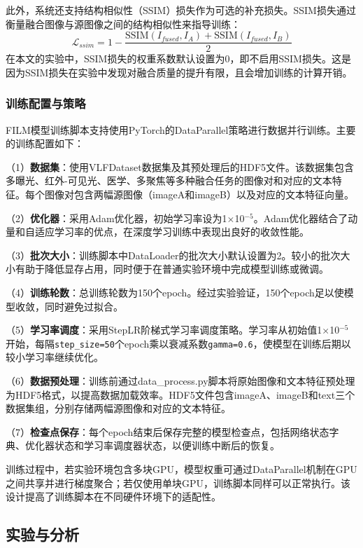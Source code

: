 此外，系统还支持结构相似性（SSIM）损失作为可选的补充损失。SSIM损失通过衡量融合图像与源图像之间的结构相似性来指导训练：
\begin{equation}
    \mathcal{L}_{ssim} = 1 - \frac{\text{SSIM}(I_{fused}, I_A) + \text{SSIM}(I_{fused}, I_B)}{2}
\end{equation}
在本文的实验中，SSIM损失的权重系数默认设置为0，即不启用SSIM损失。这是因为SSIM损失在实验中发现对融合质量的提升有限，且会增加训练的计算开销。

\subsubsection{训练配置与策略}\label{sec:training_config}

FILM模型训练脚本支持使用PyTorch的DataParallel策略进行数据并行训练。主要的训练配置如下：

（1）\textbf{数据集}：使用VLFDataset数据集及其预处理后的HDF5文件。该数据集包含多曝光、红外-可见光、医学、多聚焦等多种融合任务的图像对和对应的文本特征。每个图像对包含两幅源图像（imageA和imageB）以及对应的文本特征向量。

（2）\textbf{优化器}：采用Adam优化器，初始学习率设为1$\times$10$^{-5}$。Adam优化器结合了动量和自适应学习率的优点，在深度学习训练中表现出良好的收敛性能。

（3）\textbf{批次大小}：训练脚本中DataLoader的批次大小默认设置为2。较小的批次大小有助于降低显存占用，同时便于在普通实验环境中完成模型训练或微调。

（4）\textbf{训练轮数}：总训练轮数为150个epoch。经过实验验证，150个epoch足以使模型收敛，同时避免过拟合。

（5）\textbf{学习率调度}：采用StepLR阶梯式学习率调度策略。学习率从初始值1$\times$10$^{-5}$开始，每隔\texttt{step\_size=50}个epoch乘以衰减系数\texttt{gamma=0.6}，使模型在训练后期以较小学习率继续优化。

（6）\textbf{数据预处理}：训练前通过data\_process.py脚本将原始图像和文本特征预处理为HDF5格式，以提高数据加载效率。HDF5文件包含imageA、imageB和text三个数据集组，分别存储两幅源图像和对应的文本特征。

（7）\textbf{检查点保存}：每个epoch结束后保存完整的模型检查点，包括网络状态字典、优化器状态和学习率调度器状态，以便训练中断后的恢复。

训练过程中，若实验环境包含多块GPU，模型权重可通过DataParallel机制在GPU之间共享并进行梯度聚合；若仅使用单块GPU，训练脚本同样可以正常执行。该设计提高了训练脚本在不同硬件环境下的适配性。

\subsection{实验与分析}\label{sec:experiments}

